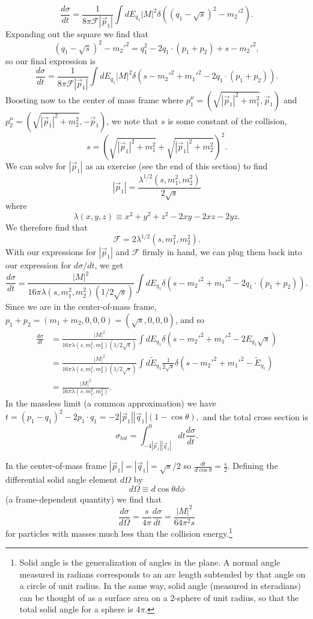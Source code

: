 $$\frac{d\sigma}{dt}=\frac{1}{8\pi \mathcal{F}|\vec p_1|}\int dE_{q_1}|M|^2 \delta((q_1-\sqrt{s})^2-{m_2'}^2).$$
Expanding out the square we find that
$$(q_1-\sqrt{s})^2-{m_2'}^2=q_1^2-2q_1\cdot(p_1+p_2)+s-{m_2'}^2,$$
so our final expression is
$$\frac{d\sigma}{dt}=\frac{1}{8\pi \mathcal{F}|\vec p_1|}\int dE_{q_1}|M|^2 \delta(s-{m_2'}^2 +{m_1'}^2-2q_1 \cdot(p_1+p_2)).$$
Boosting now to the center of mass frame where $p_1^\mu=(\sqrt{|\vec p_1|^2+m_1^2},\vec p_1)$ and $p_2^\mu=(\sqrt{|\vec p_1|^2+m_2^2},-\vec p_1)$, we note that $s$ is some constant of the collision,
$$s=\left(\sqrt{|\vec p_1|^2+m_1^2}+\sqrt{|\vec p_1|^2+m_2^2}\right)^2.$$
We can solve for $|\vec p_1|$ as an exercise (see the end of this section) to find
$$|\vec p_1|=\frac{\lambda^{1/2}(s,m_1^2,m_2^2)}{2\sqrt{s}}$$
where $$\lambda(x,y,z)\equiv x^2+y^2+z^2-2xy-2xz-2yz.$$ We therefore find that
$$\mathcal{F}=2\lambda^{1/2}(s,m_1^2,m_2^2).$$ With our expressions for $|\vec p_1|$ and $\mathcal{F}$ firmly in hand, we can plug them back into our expression for $d\sigma/dt$, we get
$$\frac{d\sigma}{dt}=\frac{|M|^2}{16\pi \lambda(s,m_1^2,m_2^2)(1/2\sqrt{s})}\int dE_{q_1} \delta(s-{m_2'}^2+{m_1'}^2-2q_1\cdot(p_1+p_2)).$$
Since we are in the center-of-mass frame, $p_1+p_2=(m_1+m_2,0,0,0)=(\sqrt{s},0,0,0)$, and so 
\begin{align*}
\frac{d\sigma}{dt}&=\frac{|M|^2}{16\pi \lambda(s,m_1^2,m_2^2)(1/2\sqrt{s})}\int dE_{q_1} \delta(s-{m_2'}^2+{m_1'}^2-2E_{q_1}\sqrt{s})\\
&=\frac{|M|^2}{16\pi \lambda(s,m_1^2,m_2^2)(1/2\sqrt{s})} \int d\tilde E_{q_1} \frac{1}{2\sqrt{s}} \delta(s-{m_2'}^2+{m_1'}^2-\tilde E_{q_1})\\
&=\frac{|M|^2}{16\pi\lambda(s,m_1^2,m_2^2)}.
\end{align*}
In the massless limit (a common approximation) we have $t=(p_1-q_1)^2-2p_1\cdot q_1 =-2|\vec p_1||\vec q_1|(1-\cos\theta),$ and the total cross section is
$$\sigma_{tot}=\int_{-4|\vec p_1||\vec q_1|}^0 dt \frac{d\sigma}{dt}.$$

In the center-of-mass frame $|\vec p_1|=|\vec q_1|=\sqrt{s}/2$ so $\frac{dt}{d\cos\theta}=\frac{s}{2}$. Defining the differential solid angle element $d\Omega$ by
$$d\Omega\equiv d\cos\theta d\phi$$ (a frame-dependent quantity) we find that
$$\frac{d\sigma}{d\Omega}=\frac{s}{4\pi}\frac{d\sigma}{dt}=\frac{|M|^2}{64\pi^2 s}$$
for particles with masses much less than the collision energy.\footnote{Solid angle is the generalization of angles in the plane. A normal angle measured in radians corresponds to an arc length subtended by that angle on a circle of unit radius. In the same way, solid angle (measured in steradians) can be thought of as a surface area on a $2$-sphere of unit radius, so that the total solid angle for a sphere is $4\pi$.}

